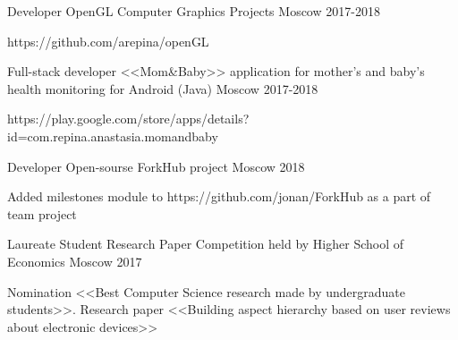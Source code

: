 


\begin{cventries}
	

\cventry
{Developer} %
{OpenGL Computer Graphics Projects} %
{Moscow} %
{2017-2018} %
{ %
	\begin{cvitems}
		\item {https://github.com/arepina/openGL}
	\end{cvitems}
}
	
		
	
\cventry
{Full-stack developer} %
{<<Mom\&Baby>> application for mother's and baby's health monitoring for Android  (Java) } %
{Moscow} %
{2017-2018} %
{ %
	\begin{cvitems}
		\item {https://play.google.com/store/apps/details?id=com.repina.anastasia.momandbaby}
	\end{cvitems}
}

	

\cventry
{Developer} %
{Open-sourse ForkHub project} %
{Moscow} %
{2018} %
{ %
	\begin{cvitems}
		\item {Added milestones module to https://github.com/jonan/ForkHub as a part of team project}
	\end{cvitems}
}	
	

\cventry
{Laureate} %
{Student Research Paper Competition held by Higher School of Economics} %
{Moscow} %
{2017} %
{ %
	\begin{cvitems}
		\item {Nomination <<Best Computer Science research made by undergraduate students>>. Research paper <<Building aspect hierarchy based on user reviews about electronic devices>>}
	\end{cvitems}
}


\end{cventries}

